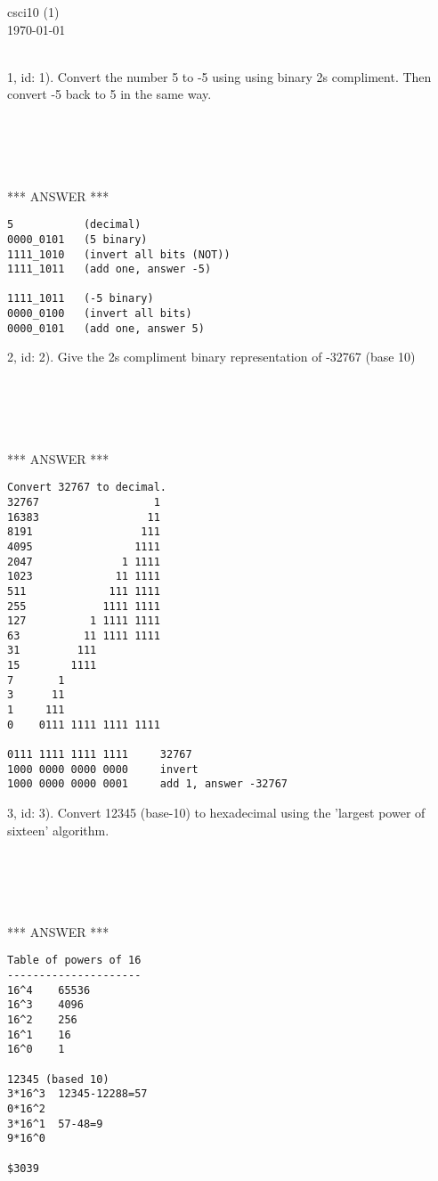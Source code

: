 \documentclass[fleqn]{article}
\begin{document}
\begin{flushleft}
csci10 (1)\\
\today
\end{flushleft}
\\

1, id: 1).  Convert the number 5 to -5 using using binary 2s compliment.
Then convert -5 back to 5 in the same way.
\begin{verbatim}





\end{verbatim}

*** ANSWER ***

\begin{verbatim}
5 			(decimal)
0000_0101   (5 binary)
1111_1010	(invert all bits (NOT))
1111_1011	(add one, answer -5)

1111_1011   (-5 binary)
0000_0100   (invert all bits)
0000_0101   (add one, answer 5)
\end{verbatim}

2, id: 2).  Give the 2s compliment binary representation of -32767 (base 10)
\begin{verbatim}





\end{verbatim}

*** ANSWER ***

\begin{verbatim}
Convert 32767 to decimal.
32767				   1
16383		   	      11
8191		  	     111
4095		 	    1111
2047	   	      1 1111
1023      	     11 1111
511      	    111 1111
255     	   1111 1111
127   	     1 1111 1111
63	        11 1111 1111
31         111
15        1111
7       1
3      11
1  	  111
0 	 0111 1111 1111 1111

0111 1111 1111 1111		32767
1000 0000 0000 0000		invert
1000 0000 0000 0001		add 1, answer -32767
\end{verbatim}

3, id: 3).  Convert 12345 (base-10) to hexadecimal using the 'largest power of sixteen' algorithm.
\begin{verbatim}





\end{verbatim}

*** ANSWER ***

\begin{verbatim}
Table of powers of 16
---------------------
16^4	65536
16^3	4096
16^2	256
16^1	16
16^0	1

12345 (based 10)
3*16^3	12345-12288=57
0*16^2
3*16^1	57-48=9
9*16^0  

$3039
\end{verbatim}
\end{document}
